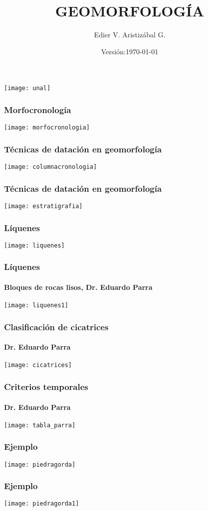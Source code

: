 \documentclass{beamer}
\title[Geoforma: Componente Interno]{GEOMORFOLOGÍA}
\author[Edier Aristizabal]{Edier V. Aristizábal G.}
\institute{evaristizabalg@unal.edu.co}
\date{\tiny{Versión:\today}}
\begin{document}
\begin{frame}
\titlepage
\centering
   	\texttt{[image: unal]} 
\end{frame}
\begin{frame}
\frametitle{Morfocronología}
\centering
\texttt{[image: morfocronologia]}
\end{frame}
\begin{frame}
\frametitle{Técnicas de datación en geomorfología}
\centering
\texttt{[image: columnacronologia]}
\end{frame}
\begin{frame}
\frametitle{Técnicas de datación en geomorfología}
\centering
\texttt{[image: estratigrafia]}
\end{frame}
\begin{frame}
\frametitle{Líquenes}
\centering
\texttt{[image: liquenes]}
\end{frame}
\begin{frame}
\frametitle{Líquenes}
\framesubtitle{Bloques de rocas lisos, Dr. Eduardo Parra}
\centering
\texttt{[image: liquenes1]}
\end{frame}
\begin{frame}
\frametitle{Clasificación de cicatrices}
\framesubtitle{Dr. Eduardo Parra}
\centering
\texttt{[image: cicatrices]}
\end{frame}
\begin{frame}
\frametitle{Criterios temporales}
\framesubtitle{Dr. Eduardo Parra}
\centering
\texttt{[image: tabla\_parra]}
\end{frame}
\begin{frame}
\frametitle{Ejemplo}
\centering
\texttt{[image: piedragorda]}
\end{frame}
\begin{frame}
\frametitle{Ejemplo}
\centering
\texttt{[image: piedragorda1]}
\end{frame}
\end{document}
